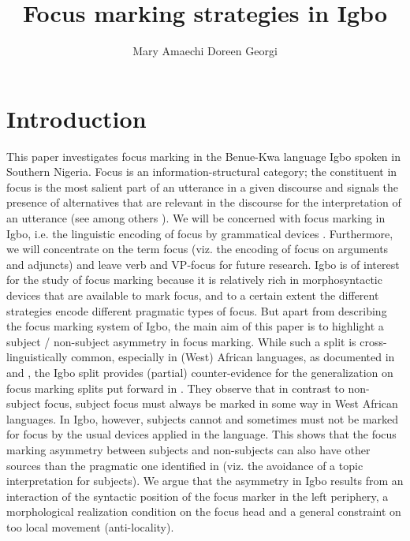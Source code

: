\documentclass[output=paper,colorlinks,citecolor=brown]{langscibook}
\title{Focus marking strategies in Igbo}
\author{%
 Mary Amaechi\affiliation{University of Potsdam}\lastand
 Doreen Georgi\affiliation{University of Potsdam}
}
\begin{document}
\maketitle 


\section{Introduction}\label{sec:amaechi:1}

This paper investigates focus marking in the Benue-Kwa language Igbo spoken in Southern Nigeria. Focus is an information-structural category; the constituent in focus is the most salient part of an utterance in a given discourse and signals the presence of alternatives that are relevant in the discourse for the interpretation of an utterance (see among others \citealt{Jackendoff1972, Dik1997, Rooth1985, Krifka2008, ZimmermannOnea2011}). We will be concerned with focus marking in Igbo, i.e. the linguistic encoding of focus by grammatical devices \citep{FiedlerEtAl2010}. Furthermore, we will concentrate on the term focus (viz. the encoding of focus on arguments and adjuncts) and leave verb and VP-focus for future research. Igbo is of interest for the study of focus marking because it is relatively rich in  morphosyntactic devices that are available to mark focus, and to a certain extent the different strategies encode different pragmatic types of focus. But apart from describing the focus marking system of Igbo, the main aim of this paper is to highlight a subject / non-subject asymmetry in focus marking. While such a split is cross-linguistically common, especially in (West) African languages, as documented in \citet{FiedlerEtAl2010} and \citet{Kalinowski2015}, the Igbo split provides (partial) counter-evidence for the generalization on focus marking splits put forward in \citet{FiedlerEtAl2010}. They observe that in contrast to non-subject focus, subject focus must always be marked in some way in West African languages. In Igbo, however, subjects cannot and sometimes must not be marked for focus by the usual devices applied in the language. This shows that the focus marking asymmetry between subjects and non-subjects can also have other sources than the pragmatic one identified in \citet{FiedlerEtAl2010} (viz. the avoidance of a topic interpretation for subjects). We argue that the asymmetry in Igbo results from an interaction of the syntactic position of the focus marker in the left periphery, a morphological realization condition on the focus head and a general constraint on too local movement (anti-locality).
\end{document}
